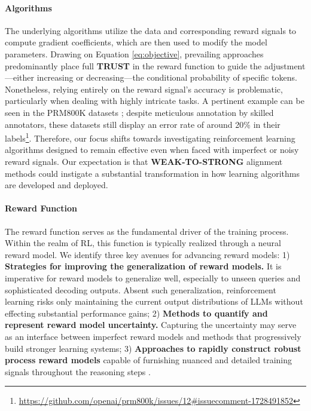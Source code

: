 \begin{itemize}[topsep=0pt]
\begin{itemize}[topsep=0pt]
\paragraph{Algorithms} The underlying algorithms utilize the data and corresponding reward signals to compute gradient coefficients, which are then used to modify the model parameters. Drawing on Equation \ref{eq:objective}, prevailing approaches predominantly place full \textbf{TRUST} in the reward function to guide the adjustment—either increasing or decreasing—the conditional probability of specific tokens. Nonetheless, relying entirely on the reward signal’s accuracy is problematic, particularly when dealing with highly intricate tasks. A pertinent example can be seen in the PRM800K datasets \citep{lightman2023let}; despite meticulous annotation by skilled annotators, these datasets still display an error rate of around 20\% in their labels\footnote{\url{https://github.com/openai/prm800k/issues/12\#issuecomment-1728491852}}. Therefore, our focus shifts towards investigating reinforcement learning algorithms designed to remain effective even when faced with imperfect or noisy reward signals. Our expectation is that \textbf{WEAK-TO-STRONG} \citep{burns2023weak} alignment methods could instigate a substantial transformation in how learning algorithms are developed and deployed.

\paragraph{Reward Function} The reward function serves as the fundamental driver of the training process. Within the realm of RL, this function is typically realized through a neural reward model. We identify three key avenues for advancing reward models: 1) \textbf{Strategies for improving the generalization of reward models.} It is imperative for reward models to generalize well, especially to unseen queries and sophisticated decoding outputs. Absent such generalization, reinforcement learning risks only maintaining the current output distributions of LLMs without effecting substantial performance gains; 2) \textbf{Methods to quantify and represent reward model uncertainty.} Capturing the uncertainty may serve as an interface between imperfect reward models and methods that progressively build stronger learning systems; 3) \textbf{Approaches to rapidly construct robust process reward models} capable of furnishing nuanced and detailed training signals throughout the reasoning steps \citep{lightman2023let,wang2023math}.


\end{itemize}
\end{itemize}
